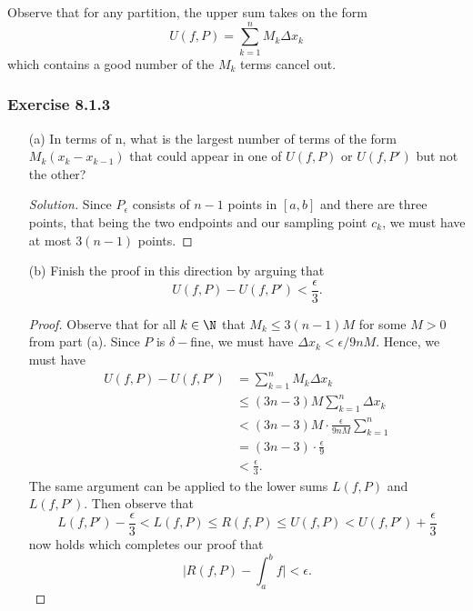 Observe that for any partition, the upper sum takes on the form 
\[  U(f,P) = \sum_{ k=1 }^{ n } M_{k } \Delta x_{k } \] which contains a good number of the \( M_{k }  \) terms cancel out.
\subsubsection{Exercise 8.1.3 } 
\begin{enumerate}
    \item[(a)] In terms of n, what is the largest number of terms of the form \( M_{k} ( x_{k } - x_{k-1} ) \) that could appear in one of \( U(f,P)  \) or \( U(f,P') \) but not the other?
        \begin{proof}[Solution]
            Since \( P_{\epsilon } \) consists of \( n-1  \) points in \( [a,b]  \) and there are three points, that being the two endpoints and our sampling point \( c_{k }  \), we must have at most \( 3(n-1)  \) points.
        \end{proof}
    \item[(b)] Finish the proof in this direction by arguing that 
        \[  U(f,P) - U(f,P') < \frac{ \epsilon  }{ 3 }. \]
        \begin{proof}
        Observe that for all \( k \in \N  \) that \( M_{ k } \leq 3(n-1)M   \) for some \( M > 0  \) from part (a). Since \( P  \) is \( \delta- \)fine, we must have \( \Delta x_{k } < \epsilon / 9nM \). Hence, we must have   
        \begin{align*}
            U(f,P) - U(f, P') &= \sum_{ k=1  }^{ n  } M_{k } \Delta x_{ k }  \\
                              &\leq (3n-3)M \sum_{ k=1 }^{ n } \Delta x_{k } \\  
                              &< (3n-3)M \cdot \frac{ \epsilon  }{ 9nM  } \sum_{ k=1 }^{ n } \\
                              &= (3n-3) \cdot \frac{ \epsilon  }{ 9  } \\ 
                              &< \frac{ \epsilon  }{ 3 }.
        \end{align*}
        The same argument can be applied to the lower sums \( L(f,P)  \) and \( L(f,P') \). Then observe that 
        \[   L(f,P') - \frac{ \epsilon  }{ 3 } <  L(f,P) \leq R(f,P) \leq U(f,P) < U(f,P') + \frac{ \epsilon  }{ 3 }  \] now holds which completes our proof that 
        \[ \Big| R(f,P) - \int_{ a }^{ b } f  \Big| < \epsilon. \]
        \end{proof}
\end{enumerate}





